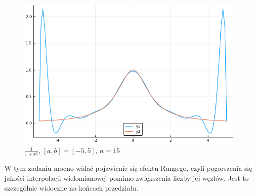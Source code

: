\documentclass{article}
\begin{document}
\begin{figure}[H]
	\includegraphics[width=\linewidth]{zad6b_15.png}
	\caption{$\frac{1}{1+x^2}$, $[a,b]=[-5,5]$, $n=15$}
	\label{fig:5a5}
\end{figure}
W tym zadaniu mocno widać pojawienie się efektu Rungego, czyli pogorszenia się jakości interpolacji wielomianowej pomimo zwiększenia liczby jej węzłów. Jest to szczególnie widoczne na końcach przedziału.
\end{document}
